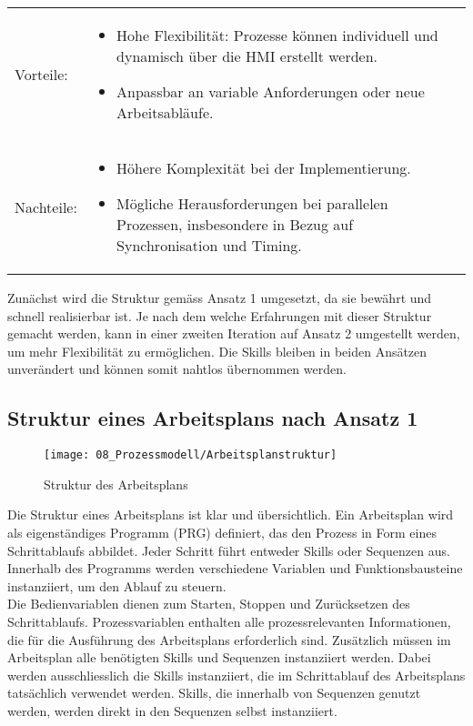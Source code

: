 	\begin{tabularx}{\textwidth}{@{}>{}p{5em} X@{}}
		Vorteile: 	& 	\vspace{-3mm} \begin{itemize}
							\item Hohe Flexibilität: Prozesse können individuell und dynamisch über die HMI erstellt werden.
							\item Anpassbar an variable Anforderungen oder neue Arbeitsabläufe.
		\end{itemize}
		\\
		Nachteile: 	& 	\vspace{-3mm} \begin{itemize}
							\item Höhere Komplexität bei der Implementierung.
							\item Mögliche Herausforderungen bei parallelen Prozessen, insbesondere in Bezug auf Synchronisation und Timing.
		\end{itemize}
		\\
	\end{tabularx} 
	
	\newpage
	
	Zunächst wird die Struktur gemäss Ansatz 1 umgesetzt, da sie bewährt und schnell realisierbar ist. Je nach dem welche Erfahrungen mit dieser Struktur gemacht werden, kann in einer zweiten Iteration auf Ansatz 2 umgestellt werden, um mehr Flexibilität zu ermöglichen. Die Skills bleiben in beiden Ansätzen unverändert und können somit nahtlos übernommen werden.
	
	\subsection{Struktur eines Arbeitsplans nach Ansatz 1} \label{Arbeitsplanstruktur}
	
		\begin{wrapfigure}{r}{0.55\textwidth}
			\centering
			\texttt{[image: 08\_Prozessmodell/Arbeitsplanstruktur]}
			\captionsetup{justification=centering}
			\caption{Struktur des Arbeitsplans}
			\label{fig:Arbeitsplanstruktur}
		\end{wrapfigure} \par	
		Die Struktur eines Arbeitsplans ist klar und übersichtlich. Ein Arbeitsplan wird als eigenständiges Programm (PRG) definiert, das den Prozess in Form eines Schrittablaufs abbildet. Jeder Schritt führt entweder Skills oder Sequenzen aus. Innerhalb des Programms werden verschiedene Variablen und Funktionsbausteine instanziiert, um den Ablauf zu steuern.
		\\
		Die Bedienvariablen dienen zum Starten, Stoppen und Zurücksetzen des Schrittablaufs. Prozessvariablen enthalten alle prozessrelevanten Informationen, die für die Ausführung des Arbeitsplans erforderlich sind. Zusätzlich müssen im Arbeitsplan alle benötigten Skills und Sequenzen instanziiert werden. Dabei werden ausschliesslich die Skills instanziiert, die im Schrittablauf des Arbeitsplans tatsächlich verwendet werden. Skills, die innerhalb von Sequenzen genutzt werden, werden direkt in den Sequenzen selbst instanziiert.
		
